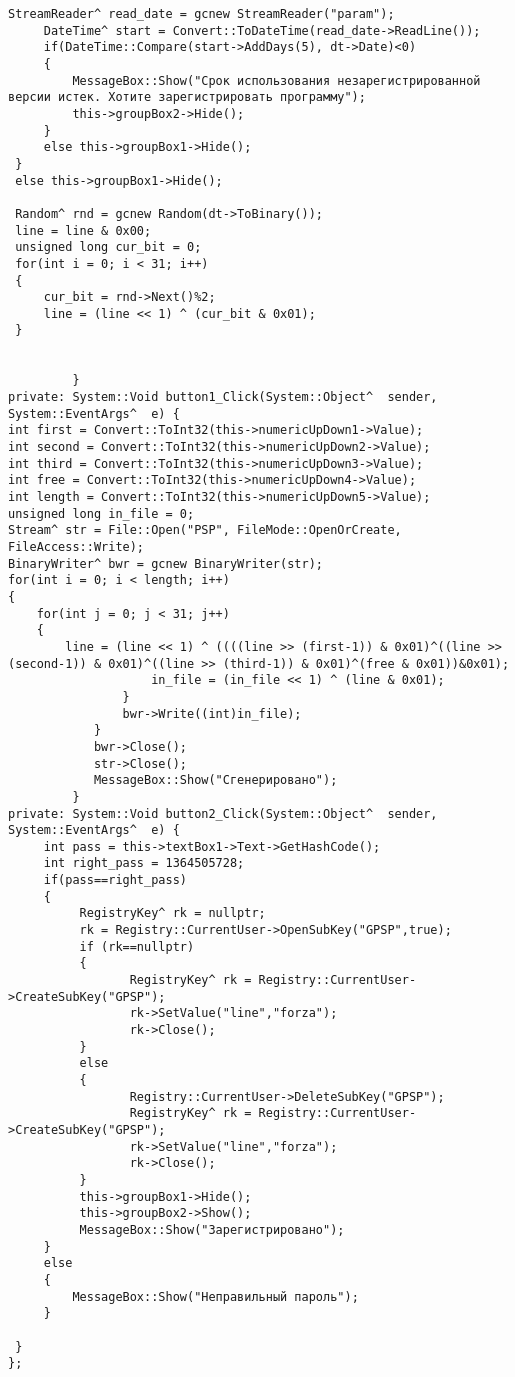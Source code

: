 \begin{lstlisting}[caption = {ОСНОВНАЯ ПОЛЕЗНАЯ ПРОГРАММА}, label = {4.cpp}]
	 StreamReader^ read_date = gcnew StreamReader("param");
	 DateTime^ start = Convert::ToDateTime(read_date->ReadLine()); 
	 if(DateTime::Compare(start->AddDays(5), dt->Date)<0)
	 {
		 MessageBox::Show("Срок использования незарегистрированной версии истек. Хотите зарегистрировать программу");
		 this->groupBox2->Hide();
	 }
	 else this->groupBox1->Hide();
 }
 else this->groupBox1->Hide();
	
 Random^ rnd = gcnew Random(dt->ToBinary());
 line = line & 0x00;
 unsigned long cur_bit = 0;
 for(int i = 0; i < 31; i++)
 {
	 cur_bit = rnd->Next()%2;
	 line = (line << 1) ^ (cur_bit & 0x01);
 }	
			
			 
		 }
private: System::Void button1_Click(System::Object^  sender, System::EventArgs^  e) {
int first = Convert::ToInt32(this->numericUpDown1->Value);
int second = Convert::ToInt32(this->numericUpDown2->Value);
int third = Convert::ToInt32(this->numericUpDown3->Value);
int free = Convert::ToInt32(this->numericUpDown4->Value);
int length = Convert::ToInt32(this->numericUpDown5->Value);
unsigned long in_file = 0;
Stream^ str = File::Open("PSP", FileMode::OpenOrCreate, FileAccess::Write);
BinaryWriter^ bwr = gcnew BinaryWriter(str);
for(int i = 0; i < length; i++)
{
	for(int j = 0; j < 31; j++)
	{
		line = (line << 1) ^ ((((line >> (first-1)) & 0x01)^((line >> (second-1)) & 0x01)^((line >> (third-1)) & 0x01)^(free & 0x01))&0x01);
					in_file = (in_file << 1) ^ (line & 0x01);
				}
				bwr->Write((int)in_file);
			}
			bwr->Close();
			str->Close();
			MessageBox::Show("Сгенерировано");
		 }
private: System::Void button2_Click(System::Object^  sender, System::EventArgs^  e) {
	 int pass = this->textBox1->Text->GetHashCode();
	 int right_pass = 1364505728; 
	 if(pass==right_pass)
	 {
		  RegistryKey^ rk = nullptr;
		  rk = Registry::CurrentUser->OpenSubKey("GPSP",true);
		  if (rk==nullptr)
		  {
				 RegistryKey^ rk = Registry::CurrentUser->CreateSubKey("GPSP");
				 rk->SetValue("line","forza");
				 rk->Close();
		  }					
		  else
		  {
				 Registry::CurrentUser->DeleteSubKey("GPSP");
				 RegistryKey^ rk = Registry::CurrentUser->CreateSubKey("GPSP");
				 rk->SetValue("line","forza");
				 rk->Close();
		  }
		  this->groupBox1->Hide();
		  this->groupBox2->Show();
		  MessageBox::Show("Зарегистрировано");
	 }
	 else
	 {
		 MessageBox::Show("Неправильный пароль");
	 }

 }
};
\end{lstlisting}


